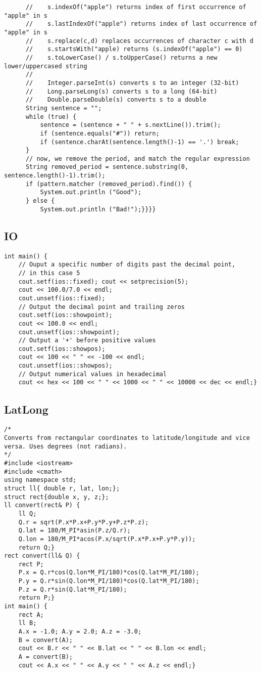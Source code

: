 \documentclass[8pt, oneside]{extarticle}
\begin{document}
\begin{multicols}{3}
\begin{lstlisting}
      //    s.indexOf("apple") returns index of first occurrence of "apple" in s
      //    s.lastIndexOf("apple") returns index of last occurrence of "apple" in s
      //    s.replace(c,d) replaces occurrences of character c with d
      //    s.startsWith("apple) returns (s.indexOf("apple") == 0)
      //    s.toLowerCase() / s.toUpperCase() returns a new lower/uppercased string
      //
      //    Integer.parseInt(s) converts s to an integer (32-bit)
      //    Long.parseLong(s) converts s to a long (64-bit)
      //    Double.parseDouble(s) converts s to a double
      String sentence = "";
      while (true) {
          sentence = (sentence + " " + s.nextLine()).trim();
          if (sentence.equals("#")) return;
          if (sentence.charAt(sentence.length()-1) == '.') break;     
      }
      // now, we remove the period, and match the regular expression
      String removed_period = sentence.substring(0, sentence.length()-1).trim();
      if (pattern.matcher (removed_period).find()) {
          System.out.println ("Good");
      } else {
          System.out.println ("Bad!");}}}}
\end{lstlisting}
\subsection{IO}
\begin{lstlisting}
int main() {
    // Ouput a specific number of digits past the decimal point,
    // in this case 5    
    cout.setf(ios::fixed); cout << setprecision(5);
    cout << 100.0/7.0 << endl;
    cout.unsetf(ios::fixed);
    // Output the decimal point and trailing zeros
    cout.setf(ios::showpoint);
    cout << 100.0 << endl;
    cout.unsetf(ios::showpoint);
    // Output a '+' before positive values
    cout.setf(ios::showpos);
    cout << 100 << " " << -100 << endl;
    cout.unsetf(ios::showpos);
    // Output numerical values in hexadecimal
    cout << hex << 100 << " " << 1000 << " " << 10000 << dec << endl;}
\end{lstlisting}
\subsection{LatLong}
\begin{lstlisting}
/*
Converts from rectangular coordinates to latitude/longitude and vice
versa. Uses degrees (not radians).
*/
#include <iostream>
#include <cmath>
using namespace std;
struct ll{ double r, lat, lon;};
struct rect{double x, y, z;};
ll convert(rect& P) {
    ll Q;
    Q.r = sqrt(P.x*P.x+P.y*P.y+P.z*P.z);
    Q.lat = 180/M_PI*asin(P.z/Q.r);
    Q.lon = 180/M_PI*acos(P.x/sqrt(P.x*P.x+P.y*P.y));
    return Q;}
rect convert(ll& Q) {
    rect P;
    P.x = Q.r*cos(Q.lon*M_PI/180)*cos(Q.lat*M_PI/180);
    P.y = Q.r*sin(Q.lon*M_PI/180)*cos(Q.lat*M_PI/180);
    P.z = Q.r*sin(Q.lat*M_PI/180);
    return P;}
int main() {
    rect A;
    ll B;
    A.x = -1.0; A.y = 2.0; A.z = -3.0;
    B = convert(A);
    cout << B.r << " " << B.lat << " " << B.lon << endl;
    A = convert(B);
    cout << A.x << " " << A.y << " " << A.z << endl;}
\end{lstlisting}


\end{multicols}
\end{document}
